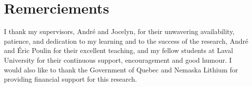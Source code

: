 \chapter*{Remerciements}        %
\label{chap-remerciements}      %

I thank my supervisors, André and Jocelyn, for their unwavering availability, patience, and dedication to my learning and to the success of the research, André and Éric Poulin for their excellent teaching, and my fellow students at Laval University for their continuous support, encouragement and good humour. I would also like to thank the Government of Quebec and Nemaska Lithium for providing financial support for this research.